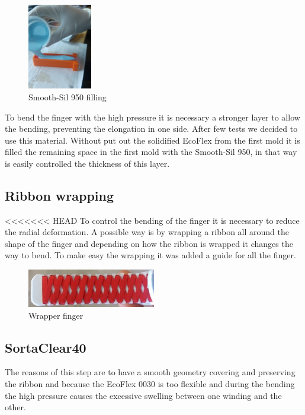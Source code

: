 \documentclass{article}
\begin{document}
\begin{figure}
\centering
    \includegraphics[width=0.25\textwidth]{Pictures/fingerOnToroidal/SmoothSil950filling.jpg}
    \caption{Smooth-Sil 950 filling}
    \label{fig:SmoothSil950filling}
\end{figure}

To bend the finger with the high pressure it is necessary a stronger layer to allow the bending, preventing the elongation in one side.
After few tests we decided to use this material. Without put out the solidified EcoFlex from the first mold it is filled the remaining space in the first mold with the Smooth-Sil 950, in that way is easily controlled the thickness of this layer.

\subsection{Ribbon wrapping}

<<<<<<< HEAD
To control the bending of the finger it is necessary to reduce the radial deformation. A possible way is by wrapping a ribbon all around the shape of the finger and depending on how the ribbon is wrapped it changes the way to bend. To make easy the wrapping it was added a guide for all the finger.

\begin{figure}[h]
	\centering
	\includegraphics[width=0.5\textwidth]{Pictures/fingerOnToroidal/wrappedFinger.jpg}
	\caption{Wrapper finger}
	\label{fig:wrappedFinger}
\end{figure}

\subsection{SortaClear40}
The reasons of this step are to have a smooth geometry covering and preserving the ribbon and because the EcoFlex 0030 is too flexible and during the bending the high pressure causes the excessive swelling between one winding and the other.
\end{document}
